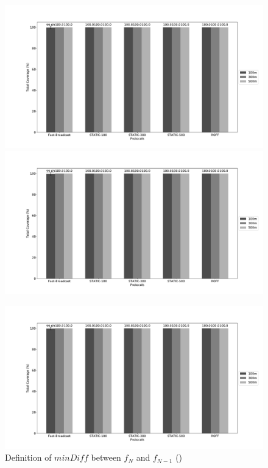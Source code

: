 		\begin{figure}[H]
	\centering
	\includegraphics[width=1.1\textwidth]{../../scripts/graphs/out/Platoon-15km/b0/j0-cw[32-1024]/totCoverage}
	\includegraphics[width=1.1\textwidth]{../../scripts/graphs/out/Platoon-15km/b0/j0-cw[32-1024]/totCoverage}
	\caption{Definition of $minDiff$ between $f_N$ and $f_{N-1}$ (\cite{6906275})}
	\label{fig:minDiff}
	\includegraphics[width=1.1\textwidth]{../../scripts/graphs/out/Platoon-15km/b0/j0-cw[32-1024]/totCoverage}

\end{figure}
